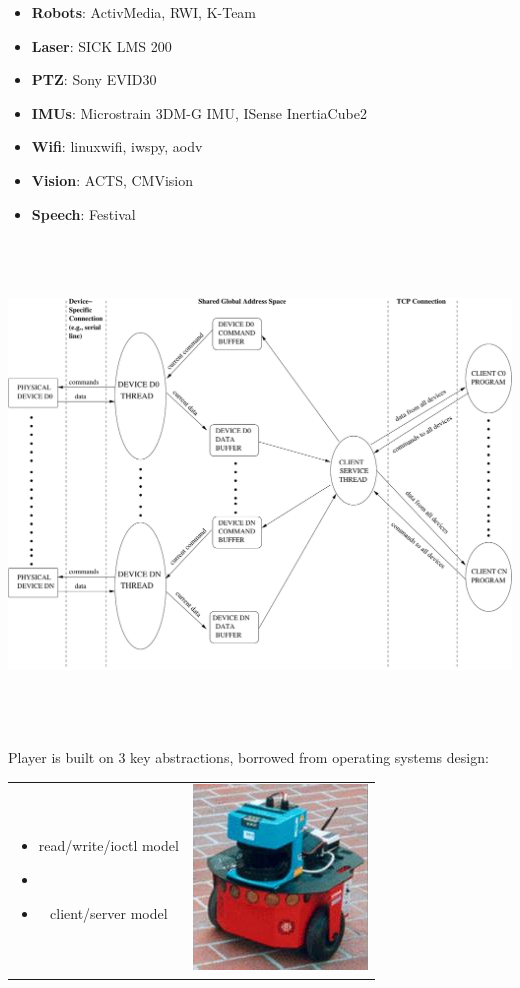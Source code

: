 \documentclass[30pt,landscape,magscalefonts]{foils}
\newcommand{\foilheadc}[1]{\foilhead{\Large \textcolor{myred}{#1}}\vspace*{-2em}}
\begin{document}
\foilheadc{Supported hardware / software}
{\small
\begin{itemize}
\item {\bf Robots}: ActivMedia, RWI, K-Team
\item {\bf Laser}: SICK LMS 200
\item {\bf PTZ}: Sony EVID30
\item {\bf IMUs}: Microstrain 3DM-G IMU, ISense InertiaCube2
\item {\bf Wifi}: linuxwifi, iwspy, aodv
\item {\bf Vision}: ACTS, CMVision
\item {\bf Speech}: Festival
\end{itemize}
}

\foilheadc{Player architecture}
\begin{center}
\includegraphics[height=130mm]{buffers.pdf}
\end{center}

\foilheadc{Player design}
Player is built on 3 key abstractions, borrowed from operating systems
design:

\begin{tabular}{cc}
\parbox{.6\textwidth}{
\begin{itemize}
\item read/write/ioctl model
\item {}
\item client/server model
\end{itemize}}
&
\parbox{.3\textwidth}{\includegraphics[width=.3\textwidth]{pioneer-2-small.jpg}}
\end{tabular}
\end{document}
